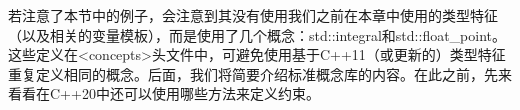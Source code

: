 若注意了本节中的例子，会注意到其没有使用我们之前在本章中使用的类型特征（以及相关的变量模板），而是使用了几个概念：std::integral和std::float\_point。这些定义在<concepts>头文件中，可避免使用基于C++11（或更新的）类型特征重复定义相同的概念。后面，我们将简要介绍标准概念库的内容。在此之前，先来看看在C++20中还可以使用哪些方法来定义约束。































































